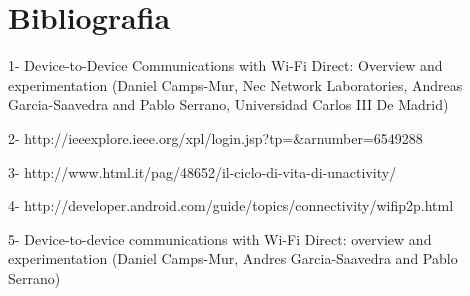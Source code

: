 \chapter{Bibliografia}

1- Device-to-Device Communications with Wi-Fi Direct: Overview and
   experimentation (Daniel Camps-Mur, Nec Network Laboratories, Andreas
   Garcia-Saavedra and Pablo Serrano, Universidad Carlos III De Madrid)
   
2- http://ieeexplore.ieee.org/xpl/login.jsp?tp=&arnumber=6549288

3- http://www.html.it/pag/48652/il-ciclo-di-vita-di-unactivity/

4- http://developer.android.com/guide/topics/connectivity/wifip2p.html

5- Device-to-device communications with Wi-Fi Direct: overview and
   experimentation (Daniel Camps-Mur, Andres Garcia-Saavedra and Pablo Serrano)
   
